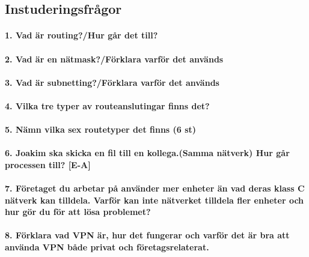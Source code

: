 \subsection{Instuderingsfrågor}

\paragraph{1. Vad är routing?/Hur går det till?}
\paragraph{2. Vad är en nätmask?/Förklara varför det används}
\paragraph{3. Vad är subnetting?/Förklara varför det används}
\paragraph{4. Vilka tre typer av routeanslutingar finns det?}
\paragraph{5. Nämn vilka sex routetyper det finns (6 st)}
\paragraph{6. Joakim ska skicka en fil till en kollega.(Samma nätverk) Hur går processen till? [E-A]}
\paragraph{7. Företaget du arbetar på använder mer enheter än vad deras klass C nätverk kan tilldela. Varför kan inte nätverket tilldela fler enheter och hur gör du för att lösa problemet?}
\paragraph{8. Förklara vad VPN är, hur det fungerar och varför det är bra att använda VPN både privat och företagsrelaterat.}
